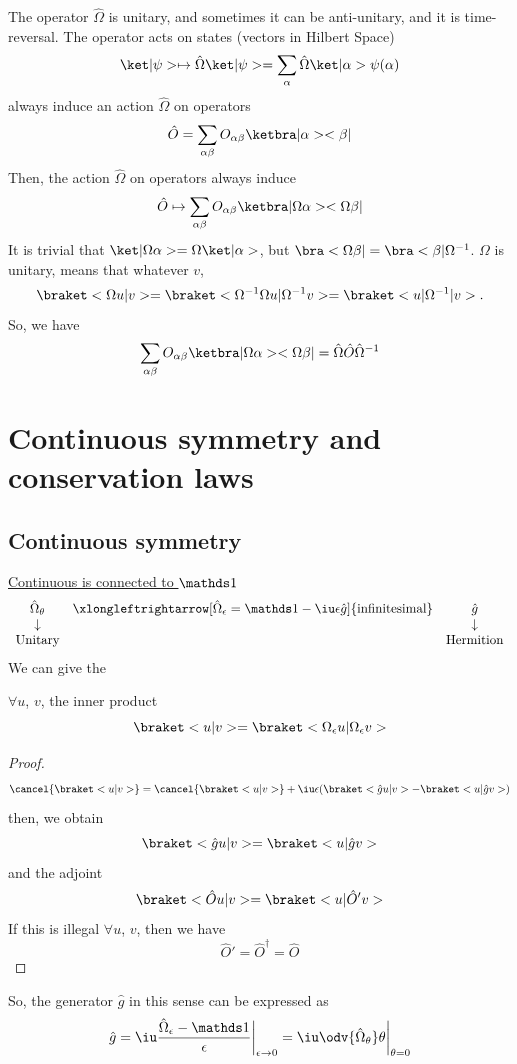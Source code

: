 The operator $\hat \Omega$ is unitary, and sometimes it can be anti-unitary,
and it is time-reversal.
The operator acts on states (vectors in Hilbert Space)
\[
  \ket|\psi> \mapsto \hat\Omega\ket|\psi>
= \sum_\alpha \hat\Omega \ket|\alpha> \psi(\alpha)
\]
always induce an action $\hat \Omega$ on operators
\[
  \hat O = \sum_{\alpha\beta} O_{\alpha\beta} \ketbra|\alpha><\beta|
\]
Then, the action $\hat \Omega$ on operators always induce
\[
  \hat O \mapsto
  \sum_{\alpha\beta} O_{\alpha\beta} \ketbra|\Omega\alpha><\Omega\beta|
\]
It is trivial that $\ket|\Omega\alpha> = \Omega\ket|\alpha>$,
but $\bra<\Omega\beta| = \bra<\beta|\Omega^{-1}$.
$\Omega$ is unitary, means that whatever $v$,
\[
  \braket<\Omega u|v> = \braket<\Omega^{-1}\Omega u|\Omega^{-1}v>
= \braket<u|\Omega^{-1}|v>.
\]
So, we have
\[
  \sum_{\alpha\beta} O_{\alpha\beta} \ketbra|\Omega\alpha><\Omega\beta|
= \hat\Omega \hat O\hat\Omega^{-1}
\]

\section{Continuous symmetry and conservation laws}

\subsection{Continuous symmetry}

\underline{Continuous is connected to $\identity$}
\[\begin{array}{ccc}
  \hat\Omega_\theta &
  \xlongleftrightarrow[\hat\Omega_\epsilon = \identity-\iu\epsilon\hat g]
    {\text{infinitesimal}} & \hat g\\
  \downarrow &  & \downarrow\\
  \text{Unitary} & & \text{Hermition}
\end{array}\]
We can give the
\begin{theorem}
  $\forall u$, $v$, the inner product
  \[
    \braket<u|v> = \braket<\Omega_\epsilon u|\Omega_\epsilon v>
  \]
  \begin{proof}
    \[
      \cancel{\braket<u|v>}
    = \cancel{\braket<u|v>}
    + \iu\epsilon(\braket<\hat gu|v> - \braket<u|\hat gv>)
    \]
    then, we obtain
    \[
      \braket<\hat gu|v> = \braket<u|\hat gv>
    \]
    and the adjoint
    \[
      \braket<\hat Ou|v> = \braket<u|\hat O'v>
    \]
    If this is illegal $\forall u$, $v$, then we have
    \[
      \hat O' = \hat O^\dagger = \hat O
    \]
  \end{proof}
\end{theorem}
So, the generator $\hat g$ in this sense can be expressed as
\[
  \hat g = \iu\frac{\hat\Omega_\epsilon - \identity}{\epsilon}
            \bigg|_{\epsilon\to0}
= \iu \odv{\hat\Omega_\theta}\theta \bigg|_{\theta=0}
\]
